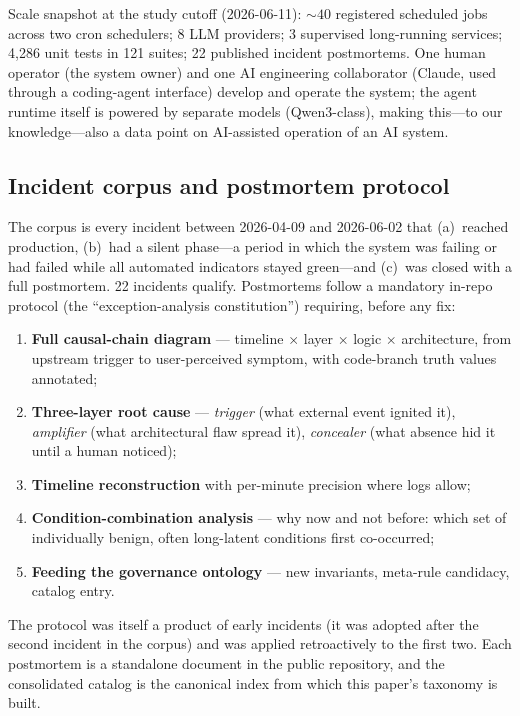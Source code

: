 Scale snapshot at the study cutoff (2026-06-11): ${\sim}40$ registered
scheduled jobs across two cron schedulers; 8 LLM providers; 3 supervised
long-running services; 4{,}286 unit tests in 121 suites; 22 published
incident postmortems. One human operator (the system owner) and one AI
engineering collaborator (Claude, used through a coding-agent interface)
develop and operate the system; the agent runtime itself is powered by
separate models (Qwen3-class), making this---to our knowledge---also a
data point on AI-assisted operation of an AI system.

\subsection{Incident corpus and postmortem protocol}\label{sec:protocol}

The corpus is every incident between 2026-04-09 and 2026-06-02 that
(a)~reached production, (b)~had a silent phase---a period in which the
system was failing or had failed while all automated indicators stayed
green---and (c)~was closed with a full postmortem. 22 incidents qualify.
Postmortems follow a mandatory in-repo protocol (the
``exception-analysis constitution'') requiring, before any fix:

\begin{enumerate}
\item \textbf{Full causal-chain diagram} --- timeline $\times$ layer
$\times$ logic $\times$ architecture, from upstream trigger to
user-perceived symptom, with code-branch truth values annotated;
\item \textbf{Three-layer root cause} --- \emph{trigger} (what external
event ignited it), \emph{amplifier} (what architectural flaw spread it),
\emph{concealer} (what absence hid it until a human noticed);
\item \textbf{Timeline reconstruction} with per-minute precision where
logs allow;
\item \textbf{Condition-combination analysis} --- why now and not before:
which set of individually benign, often long-latent conditions first
co-occurred;
\item \textbf{Feeding the governance ontology} --- new invariants,
meta-rule candidacy, catalog entry.
\end{enumerate}

The protocol was itself a product of early incidents (it was adopted
after the second incident in the corpus) and was applied retroactively to
the first two. Each postmortem is a standalone document in the public
repository, and the consolidated catalog is the canonical index from
which this paper's taxonomy is built.

